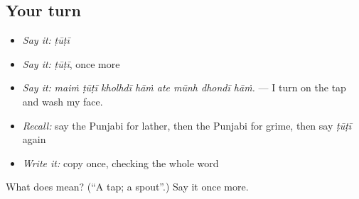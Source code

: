 \subsection*{Your turn}
\begin{itemize}
\raggedright
  \item \emph{Say it:} \emph{ṭūṭī}
  \item \emph{Say it:} \emph{ṭūṭī}, once more
  \item \emph{Say it:} \emph{maiṁ ṭūṭī kholhdī hāṁ ate mūnh dhondī hāṁ.} — I turn on the tap and wash my face.
  \item \emph{Recall:} say the Punjabi for lather, then the Punjabi for grime, then say \emph{ṭūṭī} again
  \item \emph{Write it:} copy \textbf{} once, checking the whole word
\end{itemize}

\begin{tcolorbox}[breakable,colback=teal!4,colframe=teal!35!black,title={Before you move on}]
What does  mean? (\textquotedblleft{}A tap; a spout\textquotedblright{}.) Say it once more.
\end{tcolorbox}

